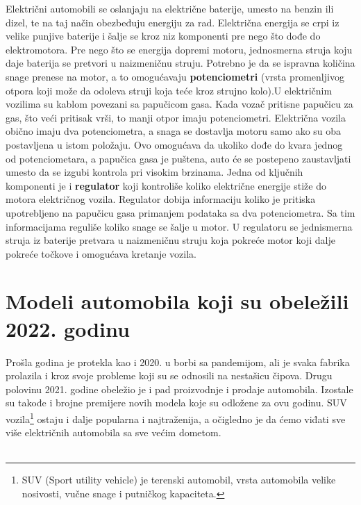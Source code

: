 \documentclass[a4paper]{article}
\begin{document}
Električni automobili se oslanjaju na električne baterije, umesto na benzin ili dizel, te na taj način obezbeđuju energiju za rad. Električna energija se crpi iz velike punjive baterije i šalje se kroz niz komponenti pre nego što dođe do elektromotora. Pre nego što se energija dopremi motoru, jednosmerna struja koju daje baterija se pretvori u naizmeničnu struju.
Potrebno je da se ispravna količina snage prenese na motor, a to omogućavaju \textbf{potenciometri} (vrsta promenljivog otpora koji može da odoleva struji koja teće kroz strujno kolo).U električnim vozilima su kablom povezani sa papučicom gasa. Kada vozač pritisne papučicu za gas, što veći pritisak vrši, to manji otpor imaju potenciometri. Električna vozila obično imaju dva potenciometra, a snaga se dostavlja motoru samo ako su oba postavljena u istom položaju. Ovo omogućava da ukoliko dođe do kvara jednog od potenciometara, a papučica gasa je puštena, auto će se postepeno zaustavljati umesto da se izgubi kontrola pri visokim brzinama. Jedna od ključnih komponenti je i \textbf{regulator} koji kontroliše koliko električne energije stiže do motora električnog vozila. Regulator dobija informaciju koliko je pritiska upotrebljeno na papučicu gasa primanjem podataka sa dva potenciometra. Sa tim informacijama reguliše koliko snage se šalje u motor. U regulatoru se jednismerna struja iz baterije pretvara u naizmeničnu struju koja pokreće motor koji dalje pokreće točkove i omogućava kretanje vozila. 

\section{Modeli automobila koji su obeležili 2022. godinu\vspace{2ex}}
\label{sec:MODELI AUTOMOBILA KOJI SU OBELEŽILI 2022. GODINU}

   Prošla godina je protekla kao i 2020. u borbi sa pandemijom, ali je svaka fabrika prolazila i kroz svoje probleme koji su se odnosili na nestašicu čipova. Drugu polovinu 2021. godine obeležio je i pad proizvodnje i prodaje automobila. Izostale su takođe i brojne premijere novih modela koje su odložene za ovu godinu. SUV vozila\footnote{SUV (Sport utility vehicle) je terenski automobil, vrsta automobila velike nosivosti, vučne snage i putničkog kapaciteta.} ostaju i dalje popularna i najtraženija, a očigledno je da ćemo viđati sve više električnih automobila sa sve većim dometom.\\\\
\end{document}
